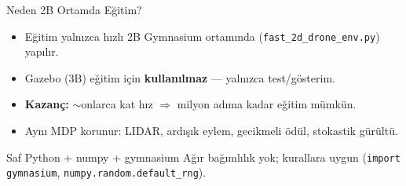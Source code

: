 \documentclass[aspectratio=169,11pt]{beamer}
\begin{document}
\begin{frame}{Neden 2B Ortamda Eğitim?}
  \begin{itemize}
    \item Eğitim \alert{yalnızca} hızlı 2B Gymnasium ortamında
    (\texttt{fast\_2d\_drone\_env.py}) yapılır.
    \item Gazebo (3B) eğitim için \textbf{kullanılmaz} --- yalnızca test/gösterim.
    \item \textbf{Kazanç:} $\sim$onlarca kat hız $\Rightarrow$ milyon adıma kadar
    eğitim mümkün.
    \item Aynı MDP korunur: LIDAR, ardışık eylem, gecikmeli ödül, stokastik
    gürültü.
  \end{itemize}
  \vfill
  \begin{block}{Saf Python + numpy + gymnasium}
    Ağır bağımlılık yok; kurallara uygun (\texttt{import gymnasium},
    \texttt{numpy.random.default\_rng}).
  \end{block}
\end{frame}

\end{document}
